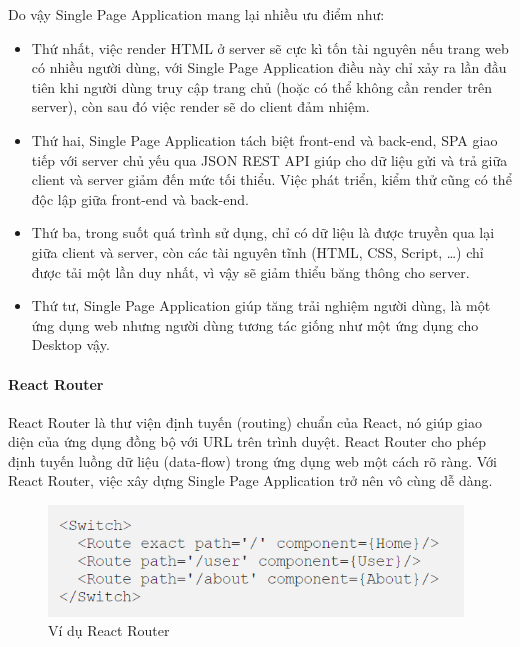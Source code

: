 Do vậy Single Page Application mang lại nhiều ưu điểm như:
\begin{itemize}[topsep=0ex]
\item Thứ nhất, việc render HTML ở server sẽ cực kì tốn
    tài nguyên nếu trang web có nhiều người dùng, với Single Page
    Application điều này chỉ xảy ra lần đầu tiên khi người dùng
    truy cập trang chủ (hoặc có thể không cần render trên server),
    còn sau đó việc render sẽ do client đảm nhiệm. 

\item Thứ hai, Single Page Application tách biệt front-end và
    back-end, SPA giao tiếp với server chủ yếu qua JSON REST API
    giúp cho dữ liệu gửi và trả giữa client và server giảm
    đến mức tối thiểu. Việc phát triển, kiểm thử cũng có thể
    độc lập giữa front-end và back-end. 

\item Thứ ba, trong suốt quá trình sử dụng, chỉ có dữ liệu là
    được truyền qua lại giữa client và server, còn các tài
    nguyên tĩnh (HTML, CSS, Script, …) chỉ được tải một
    lần duy nhất, vì vậy sẽ giảm thiểu băng thông cho server. 

\item Thứ tư, Single Page Application giúp tăng trải nghiệm người
    dùng, là một ứng dụng web nhưng người dùng tương tác
    giống như một ứng dụng cho Desktop vậy.
\end{itemize}

\paragraph{React Router}
React Router là thư viện định tuyến (routing) chuẩn của React,
nó giúp giao diện của ứng dụng đồng bộ với URL trên trình duyệt.
React Router cho phép định tuyến luồng dữ liệu (data-flow) trong
ứng dụng web một cách rõ ràng. Với React Router, việc xây dựng
Single Page Application trở nên vô cùng dễ dàng.

\begin{figure}[H]
\centering
\includegraphics[width=11cm]{images/react-router.png}
\caption{Ví dụ React Router}
\label{fig:reactrouter}
\end{figure}

